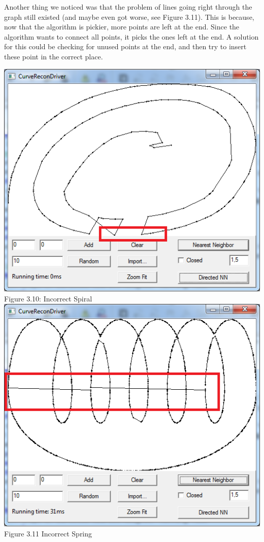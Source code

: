         \noindent Another thing we noticed was that the problem of lines going right through the graph still existed (and maybe even got worse, see Figure 3.11). This is because, now that the algorithm is pickier, more points are left at the end. Since the algorithm wants to connect all points, it picks the ones left at the end.
        A solution for this could be checking for unused points at the end, and then try to insert these point in the correct place.
        \begin{center}
        \includegraphics[scale = 0.5]{2DirectedNearestNeighbor/dnnSpiralgraph.png}\\
        \label{fig:dnn_incorrectspiral}
        Figure 3.10: Incorrect Spiral
        \includegraphics[scale = 0.5]{2DirectedNearestNeighbor/dnnSpringgraph.png}\\
        \label{fig:dnn_incorrectspring}
        Figure 3.11 Incorrect Spring
       \end{center}
